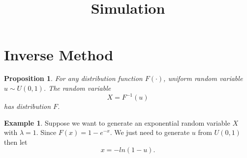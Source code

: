 \documentclass[12pt]{amsart}
\newtheorem{proposition}[theorem]{Proposition}
\theoremstyle{definition}
\newtheorem{example}[theorem]{Example}
\theoremstyle{remark}
\begin{document}
\allowdisplaybreaks
\title{Simulation}
\maketitle


\section{Inverse Method}

\begin{proposition}
For any distribution function $F(\cdot)$, uniform random variable $u \sim U(0,1)$. The random variable 
\begin{equation*}
X = F^{-1}(u)
\end{equation*} 
has distribution $F$.
\end{proposition}

\begin{example}
Suppose we want to generate  an exponential random variable $X$ with $\lambda = 1$.
Since $F(x) = 1 - e^{-x}$. We just need to generate $u$ from $U(0,1)$ then let 
\begin{equation*}
x = -ln(1-u).
\end{equation*}
\end{example}
\end{document}
